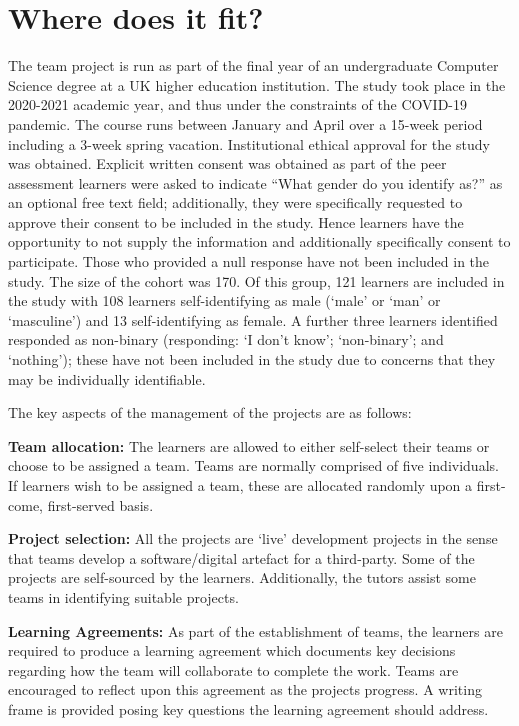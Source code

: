 \documentclass[sigconf, anonymous=true]{acmart}
\begin{document}
\section{Where does it fit?}
The team project is run as part of the final year of an undergraduate
Computer Science degree at a UK higher education institution. The
study took place in the 2020-2021 academic year, and thus under the
constraints of the COVID-19 pandemic. The course runs between January
and April over a 15-week period including a 3-week spring
vacation. Institutional ethical approval for the study was
obtained. Explicit written consent was obtained as part of the peer
assessment learners were asked to indicate ``What gender do you
identify as?'' as an optional free text field; additionally, they were
specifically requested to approve their consent to be included in the
study. Hence learners have the opportunity to not supply the
information and additionally specifically consent to
participate. Those who provided a null response have not been included
in the study. The size of the cohort was 170. Of this group, 121
learners are included in the study with 108 learners self-identifying
as male (`male' or `man' or `masculine') and 13 self-identifying as
female. A further three learners identified responded as non-binary
(responding: `I don't know'; `non-binary'; and `nothing'); these have
not been included in the study due to concerns that they may be
individually identifiable.

The key aspects of the management of the projects are as
follows:

    \textbf{Team allocation:}
The learners are allowed to either self-select their teams or choose
to be assigned a team. Teams are normally comprised of five
individuals. If learners wish to be assigned a team, these are
allocated randomly upon a first-come, first-served basis.

\textbf {Project selection:}
All the projects are `live' development projects in the sense that
teams develop a software/digital artefact for a third-party. Some of the
projects are self-sourced by the learners. Additionally, the tutors
assist some teams in identifying suitable projects.

\textbf{Learning Agreements:}
As part of the establishment of teams, the learners are required to
produce a learning agreement which documents key decisions regarding
how the team will collaborate to complete the work. Teams are
encouraged to reflect upon this agreement as the projects progress. A
writing frame is provided posing key questions the learning agreement
should address.
\end{document}
